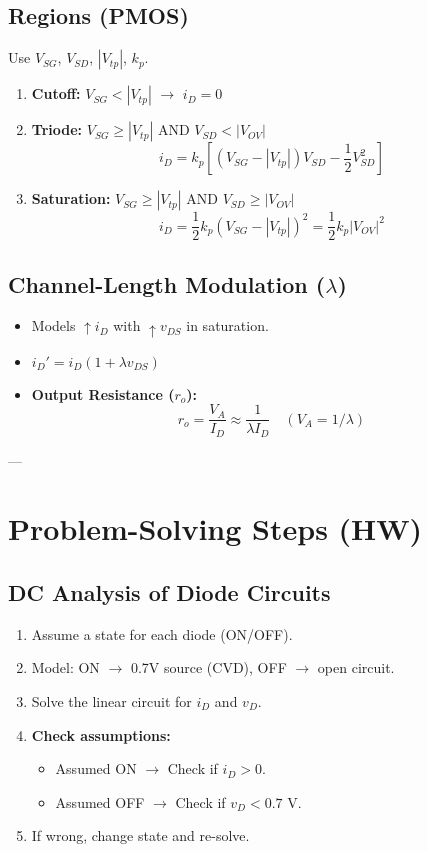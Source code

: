 \documentclass[10pt]{article}
\begin{document}
\begin{multicols*}{2}
\subsection*{Regions (PMOS)}
Use $V_{SG}$, $V_{SD}$, $|V_{tp}|$, $k_p$.
\begin{enumerate}\itemsep0pt
    \item \textbf{Cutoff:} $V_{SG} < |V_{tp}|$ $\rightarrow$ $i_D = 0$
    \item \textbf{Triode:} $V_{SG} \ge |V_{tp}|$ AND $V_{SD} < |V_{OV}|$
    \[ i_D = k_p \left[ (V_{SG} - |V_{tp}|)V_{SD} - \frac{1}{2}V_{SD}^2 \right] \]
    \item \textbf{Saturation:} $V_{SG} \ge |V_{tp}|$ AND $V_{SD} \ge |V_{OV}|$
    \[ i_D = \frac{1}{2} k_p (V_{SG} - |V_{tp}|)^2 = \frac{1}{2} k_p |V_{OV}|^2 \]
\end{enumerate}

\subsection*{Channel-Length Modulation ($\lambda$)}
\begin{itemize}\itemsep0pt
    \item Models $\uparrow i_D$ with $\uparrow v_{DS}$ in saturation.
    \item $i_D' = i_D (1 + \lambda v_{DS})$
    \item \textbf{Output Resistance ($r_o$):}
    \[ r_o = \frac{V_A}{I_D} \approx \frac{1}{\lambda I_D} \quad (V_A = 1/\lambda) \]
\end{itemize}

--- %

\section{Problem-Solving Steps (HW)}

\subsection*{DC Analysis of Diode Circuits}
\begin{enumerate}\itemsep0pt
    \item Assume a state for each diode (ON/OFF).
    \item Model: ON $\rightarrow$ 0.7V source (CVD), OFF $\rightarrow$ open circuit.
    \item Solve the linear circuit for $i_D$ and $v_D$.
    \item \textbf{Check assumptions:}
    \begin{itemize}\itemsep0pt
        \item Assumed ON $\rightarrow$ Check if $i_D > 0$.
        \item Assumed OFF $\rightarrow$ Check if $v_D < 0.7 \text{ V}$.
    \end{itemize}
    \item If wrong, change state and re-solve.
\end{enumerate}


\end{multicols*}
\end{document}
